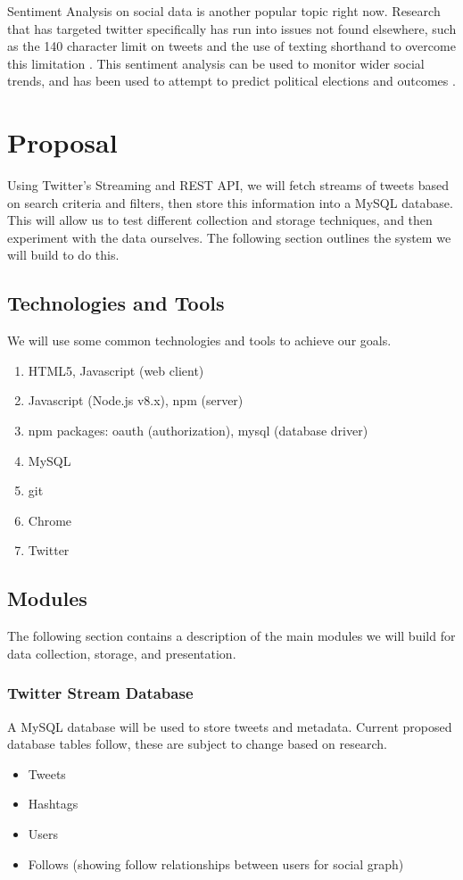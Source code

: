 \documentclass[11pt]{article}
\begin{document}
Sentiment Analysis on social data is another popular topic right now. Research that has targeted twitter specifically has run into issues not found elsewhere, such as the 140 character limit on tweets and the use of texting shorthand to overcome this limitation \cite{sentiment_2014}. This sentiment analysis can be used to monitor wider social trends, and has been used to attempt to predict political elections and outcomes \cite{DBLP:journals/corr/KulshresthaEMZG17}.

\section{Proposal}\label{results}

Using Twitter's Streaming and REST API, we will fetch streams of tweets based on search criteria and filters, then store this information into a MySQL database. This will allow us to test different collection and storage techniques, and then experiment with the data ourselves. The following section outlines the system we will build to do this.

\subsection{Technologies and Tools}

We will use some common technologies and tools to achieve our goals.
\begin{enumerate}
\itemsep0em
\item HTML5, Javascript (web client)
\item Javascript (Node.js v8.x), npm  (server)
\item npm packages: oauth (authorization), mysql (database driver)
\item MySQL
\item git
\item Chrome
\item Twitter
\end{enumerate}

\subsection{Modules}

The following section contains a description of the main modules we will build for data collection, storage, and presentation.

\subsubsection{Twitter Stream Database}
A MySQL database will be used to store tweets and metadata. Current proposed database tables follow, these are subject to change based on research.
\begin{itemize}
\itemsep0em
\item Tweets
\item Hashtags
\item Users
\item Follows (showing follow relationships between users for social graph)
\end{itemize}
\end{document}
